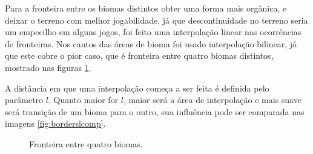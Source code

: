 Para a fronteira entre os biomas distintos obter uma forma mais orgânica, e deixar o 
terreno com melhor jogabilidade, já que descontinuidade no terreno seria um empecilho em alguns jogos,
foi feito uma interpolação linear nas ocorrências de fronteiras. Nos cantos das áreas de bioma foi 
usado interpolação bilinear, já que este cobre o pior caso, que é fronteira entre quatro biomas distintos,
mostrado nas figuras \ref{fig:wcborder4biomes}.%

A distância em que uma interpolação começa a ser feita é definida pelo parâmetro $l$.
Quanto maior for $l$, maior será a área de interpolação e mais suave será transição de um bioma para o outro,
sua influência pode ser comparada nas imagens \ref{fig:borderslcomp}.

\begin{figure}[H]
     \centering
     \hspace{0.1cm}
     
     \caption{Fronteira entre quatro biomas.}
     
     \label{fig:wcborder4biomes}
\end{figure}

